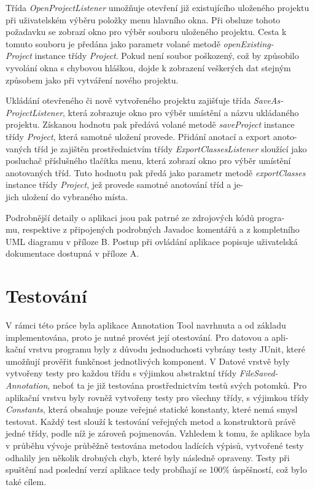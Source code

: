 \documentclass{projekt}
\begin{document}
Třída {\it OpenProjectListener} umožňuje otevření již existujícího uloženého projektu při uživatelském výběru položky menu hlavního okna. Při obsluze tohoto požadavku se zobrazí okno pro výběr souboru uloženého projektu. Cesta k tomuto souboru je předána jako parametr volané metodě {\it openExisting-\\Project} instance třídy {\it Project}. Pokud není soubor poškozený, což by způsobilo vyvolání okna s chybovou hláškou, dojde k zobrazení veškerých dat stejným způsobem jako při vytváření nového projektu.


Ukládání otevřeného či nově vytvořeného projektu zajišťuje třída {\it SaveAs-\\ProjectListener}, která zobrazuje okno pro výběr umístění a názvu ukládaného projektu. Získanou hodnotu pak předává volané metodě {\it saveProject} instance třídy {\it Project}, která samotné uložení provede.
Přidání anotací a export anoto-\\vaných tříd je zajištěn prostřednictvím třídy {\it ExportClassesListener} sloužící jako posluchač příslušného tlačítka menu, která zobrazí okno pro výběr umístění anotovaných tříd. Tuto hodnotu pak předá jako parametr metodě {\it exportClasses} instance třídy {\it Project}, jež provede samotné anotování tříd a je-\\jich uložení do vybraného místa.


Podrobnější detaily o aplikaci jsou pak patrné ze zdrojových kódů progra-\\mu, respektive z připojených podrobných Javadoc komentářů a z kompletního UML diagramu v příloze B.
Postup při ovládání aplikace popisuje uživatelská dokumentace dostupná v příloze A.


\chapter{Testování}
\hspace{0.65cm}V rámci této práce byla aplikace Annotation Tool navrhnuta a od základu implementována, proto je nutné provést její otestování. Pro datovou a apli-\\kační vrstvu programu byly z důvodu jednoduchosti vybrány testy JUnit, které umožňují prověřit funkčnost jednotlivých komponent. V Datové vrstvě byly vytvořeny testy pro každou třídu s výjimkou abstraktní třídy {\it FileSaved-\\Annotation}, neboť ta je již testována prostřednictvím testů svých potomků. 
Pro aplikační vrstvu byly rovněž vytvořeny testy pro všechny třídy, s výjimkou třídy {\it Constants}, která obsahuje pouze veřejné statické konstanty, které nemá smysl testovat. 
Každý test slouží k testování veřejných metod a konstruktorů právě jedné třídy, podle níž je zároveň pojmenován. Vzhledem k tomu, že aplikace byla v průběhu vývoje průběžně testována metodou ladících výpisů, vytvořené testy odhalily jen několik drobných chyb, které byly následně opraveny. Testy při spuštění nad poslední verzí aplikace tedy probíhají se 100\% úspěšností, což bylo také cílem.
\end{document}
